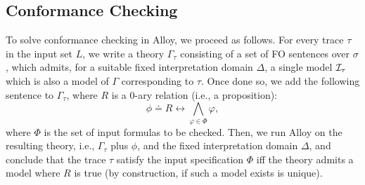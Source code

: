 \subsection{Conformance Checking}\label{subseq:alloy:conf-check}
To solve conformance checking in Alloy, we proceed as follows.
For every trace $\tau$ in the input set $L$, we write a theory
$\Gamma_\tau$ consisting of a set of FO sentences over $\sigma$,
which admits, for a suitable fixed interpretation domain $\Delta$, a
single model $\mathcal{I}_\tau$ which is also a model of $\Gamma$
corresponding to $\tau$. Once done so, we add the following
sentence to $\Gamma_\tau$, where $R$ is a $0$-ary relation
(i.e., a proposition):
$$\phi\doteq R\leftrightarrow \bigwedge_{\varphi\in \Phi} \varphi,$$
where $\Phi$ is the set of input formulas to be checked.
Then, we run Alloy on the resulting theory, i.e., $\Gamma_\tau$
plus $\phi$, and the fixed interpretation domain $\Delta$,
and conclude that the trace $\tau$ satisfy
the input specification $\Phi$ iff the theory admits a model
where $R$ is true (by construction, if such a model exists
is unique).

